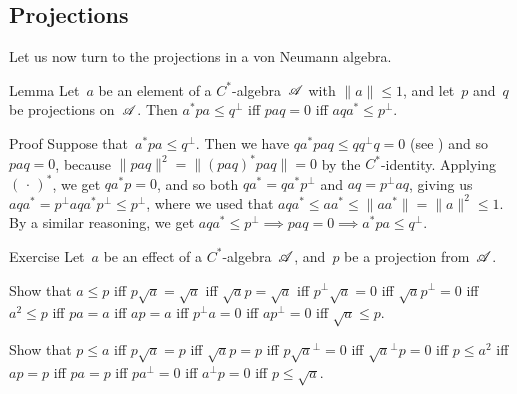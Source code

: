 \documentclass[main]{subfiles}
\begin{document}
\subsection{Projections}
Let us now turn to the projections in a von Neumann algebra.









\begin{parsec}[ad-contraposed]%
\begin{point}{Lemma}%
Let~$a$ be an element of a $C^*$-algebra~$\mathscr{A}$
with $\|a\|\leq 1$,
and let~$p$ and~$q$ be projections on~$\mathscr{A}$.
Then 
$a^* p a \leq q^\perp$
iff $paq=0$
iff  $aqa^*\leq p^\perp$.
\end{point}
\begin{point}{Proof}%
Suppose that~$a^*pa\leq q^\perp$.
Then we have $q a^*pa q \leq qq^\perp q = 0$
(see )
and so $paq=0$,
because $\|paq\|^2=\|(paq)^*paq\|=0$
by the $C^*$-identity.
Applying $(\,\cdot\,)^*$,
we get $qa^*p=0$, and so both $qa^* = qa^*p^\perp$
and $aq = p^\perp aq$, giving
us $aqa^* = p^\perp a q a^* p^\perp 
\leq p^\perp$,
where we used that $aqa^*\leq aa^*\leq \|aa^*\|=\|a\|^2\leq 1$.
By a similar reasoning,
we get $aqa^*\leq p^\perp \implies paq=0\implies a^*pa\leq q^\perp$.
\end{point}
\end{parsec}
\begin{parsec}%
\begin{point}{Exercise}%
Let~$a$ be an effect of a $C^*$-algebra~$\mathscr{A}$,
and~$p$ be a projection from~$\mathscr{A}$.
\begin{point}%
Show that $a\leq p$
iff $p\sqrt{a} = \sqrt{a}$
iff $\sqrt{a}p = \sqrt{a}$
iff $p^\perp\sqrt{a} = 0$
iff $\sqrt{a}p^\perp = 0$
iff $a^2\leq p$
iff $p a  = a$
iff $ a p = a $
iff $p^\perp a  = 0$
iff $ap^\perp = 0$
iff $\sqrt{a}\leq p$.
\end{point}
\begin{point}%
Show that $p\leq a$
iff $p \sqrt{a} = p$
iff $\sqrt{a} p = p$
iff $ p\sqrt{a}^\perp = 0$
iff $\sqrt{a}^\perp p = 0$
iff $p\leq a^2$
iff $ap=p$
iff $pa = p$
iff $pa^\perp =0$
iff $a^\perp p =0$
iff $p\leq \sqrt{a}$.
\end{point}
\end{point}
\end{parsec}
\end{document}
